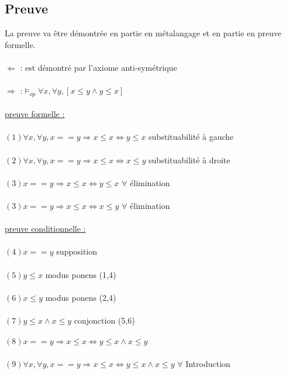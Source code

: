 \subsection{Preuve}
La preuve va être démontrée en partie en métalangage et en partie en preuve formelle.\\ \\
$\Leftarrow $ : est démontré par l'axiome anti-symétrique\\ \\
$\Rightarrow$ :$\models_{op} \forall x, \forall y, [x\leq y \land y \leq x]$ \\ \\
\underline{preuve formelle :}\\ \\
$
 (1) \forall x, \forall y, x==y \Rightarrow x \leq x \Leftrightarrow y \leq x$ \hfill substituabilité à gauche \\ \\
$(2) \forall x, \forall y, x==y \Rightarrow x \leq x \Leftrightarrow x \leq y$ \hfill substituabilité à droite \\ \\
$(3) x==y \Rightarrow x \leq x \Leftrightarrow y \leq x $ \hfill $\forall$ élimination\\ \\
$(3) x==y \Rightarrow x \leq x \Leftrightarrow x \leq y $ \hfill $\forall$ élimination\\\\
\underline{preuve conditionnelle :}\\ \\
$(4) x==y$ \hfill supposition\\ \\
$(5) y\leq x$ \hfill modus ponens (1,4)\\ \\
$(6) x\leq y$ \hfill modus ponens (2,4)\\ \\
$(7) y\leq x \land  x\leq y$ \hfill conjonction (5,6)\\ \\
$(8) x==y \Rightarrow x \leq x \Leftrightarrow y\leq x \land  x\leq y$ \\ \\
$(9) \forall x, \forall y, x==y \Rightarrow x \leq x \Leftrightarrow y\leq x \land  x\leq y$ \hfill $\forall$ Introduction\\ \\
